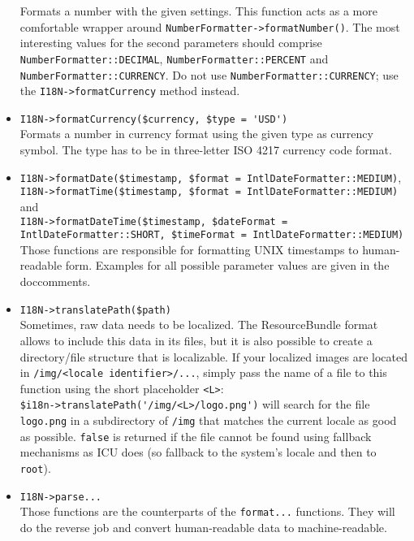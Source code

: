 \documentclass{scrartcl}
\begin{document}
\begin{itemize}
            Formats a number with the given settings. This function acts as a more comfortable wrapper around \lstinline!NumberFormatter->formatNumber()!. The most interesting values for the second parameters should comprise \lstinline!NumberFormatter::DECIMAL!, \lstinline!NumberFormatter::PERCENT! and \lstinline!NumberFormatter::CURRENCY!. Do not use \lstinline!NumberFormatter::CURRENCY!; use the \lstinline!I18N->formatCurrency! method instead.
         \item \lstinline!I18N->formatCurrency($currency, $type = 'USD')! \\
            Formats a number in currency format using the given type as currency symbol. The type has to be in three-letter ISO 4217 currency code format.
         \item \lstinline!I18N->formatDate($timestamp, $format = IntlDateFormatter::MEDIUM)!, \\\lstinline!I18N->formatTime($timestamp, $format = IntlDateFormatter::MEDIUM)! and \\\lstinline!I18N->formatDateTime($timestamp, $dateFormat = IntlDateFormatter::SHORT, $timeFormat = IntlDateFormatter::MEDIUM)! \\
            Those functions are responsible for formatting UNIX timestamps to human-readable form. Examples for all possible parameter values are given in the doccomments.
         \item \lstinline!I18N->translatePath($path)! \\
            Sometimes, raw data needs to be localized. The ResourceBundle format allows to include this data in its files, but it is also possible to create a directory/file structure that is localizable. If your localized images are located in \texttt{/img/<locale identifier>/...}, simply pass the name of a file to this function using the short placeholder \texttt{<L>}: \\
            \lstinline!$i18n->translatePath('/img/<L>/logo.png')! will search for the file \texttt{logo.png} in a subdirectory of \texttt{/img} that matches the current locale as good as possible. \lstinline!false! is returned if the file cannot be found using fallback mechanisms as ICU does (so fallback to the system's locale and then to \texttt{root}).
         \item \lstinline!I18N->parse...! \\
            Those functions are the counterparts of the \lstinline!format...! functions. They will do the reverse job and convert human-readable data to machine-readable.

\end{itemize}
\end{document}
